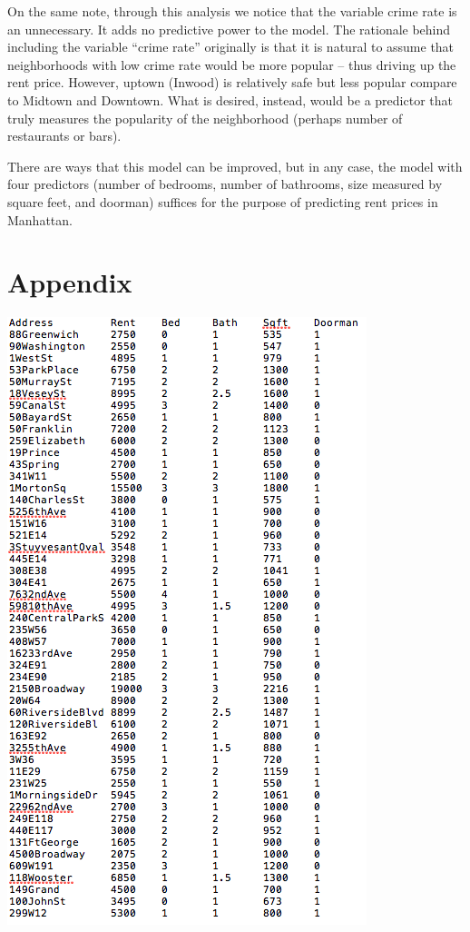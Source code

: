 \documentclass[a4 paper, 11 pt, twocolumn]{article}
\begin{document}
On the same note, through this analysis we notice that the variable crime rate is an unnecessary. It adds no predictive power to the model. The rationale behind including the variable ``crime rate'' originally is that it is natural to assume that neighborhoods with low crime rate would be more popular -- thus driving up the rent price. However, uptown (Inwood) is relatively safe but less popular compare to Midtown and Downtown. What is desired, instead, would be a predictor that truly measures the popularity of the neighborhood (perhaps number of restaurants or bars).

There are ways that this model can be improved, but in any case, the model with four predictors (number of bedrooms, number of bathrooms, size measured by square feet, and doorman) suffices for the purpose of predicting rent prices in Manhattan. 

\section{Appendix}
\begin{center}
\includegraphics[scale=0.6]{newdata}
\end{center}
\end{document}
